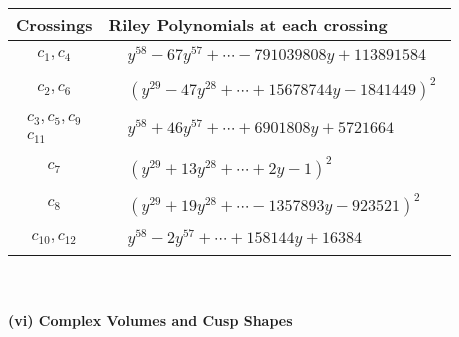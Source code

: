 \documentclass[1p]{elsarticle_modified}
\theoremstyle{definition}
\begin{document}
\begin{tabular}{m{50pt}|m{274pt}}
Crossings & \hspace{64pt}Riley Polynomials at each crossing \\
\hline $$\begin{aligned}c_{1},c_{4}\end{aligned}$$&$\begin{aligned}
&y^{58}-67 y^{57}+\cdots-791039808 y+113891584
\end{aligned}$\\
\hline $$\begin{aligned}c_{2},c_{6}\end{aligned}$$&$\begin{aligned}
&(y^{29}-47 y^{28}+\cdots+15678744 y-1841449)^{2}
\end{aligned}$\\
\hline $$\begin{aligned}c_{3},c_{5},c_{9}\\c_{11}\end{aligned}$$&$\begin{aligned}
&y^{58}+46 y^{57}+\cdots+6901808 y+5721664
\end{aligned}$\\
\hline $$\begin{aligned}c_{7}\end{aligned}$$&$\begin{aligned}
&(y^{29}+13 y^{28}+\cdots+2 y-1)^{2}
\end{aligned}$\\
\hline $$\begin{aligned}c_{8}\end{aligned}$$&$\begin{aligned}
&(y^{29}+19 y^{28}+\cdots-1357893 y-923521)^{2}
\end{aligned}$\\
\hline $$\begin{aligned}c_{10},c_{12}\end{aligned}$$&$\begin{aligned}
&y^{58}-2 y^{57}+\cdots+158144 y+16384
\end{aligned}$\\
\hline
\end{tabular}\\~\\
\newpage\flushleft \textbf{(vi) Complex Volumes and Cusp Shapes}
\end{document}

